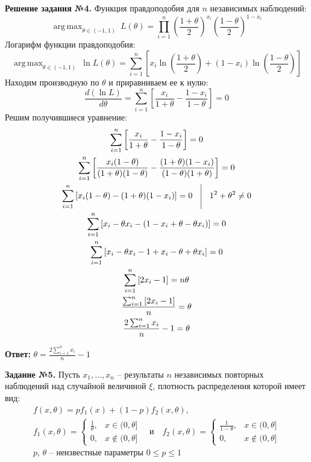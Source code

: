 \documentclass[a4paper, 12pt]{article}
\DeclareMathOperator*{\argmax}{arg\,max}
\begin{document}
{\vspace{0.5cm}

\textbf{Решение задания №4.} Функция правдоподобия для $n$ независимых наблюдений:
\[
    \argmax_{\theta \in (-1, 1)} \ L(\theta) = \prod_{i=1}^{n} \left(\frac{1 + \theta}{2}\right)^{x_i} \left(\frac{1 - \theta}{2}\right)^{1 - x_i}
\]
Логарифм функции правдоподобия:
\[
    \argmax_{\theta \in (-1, 1)} \ \ln L(\theta) = \sum_{i=1}^{n} \left[ x_i \ln\left(\frac{1 + \theta}{2}\right) + (1 - x_i) \ln\left(\frac{1 - \theta}{2}\right) \right]
\]
Находим производную по $\theta$ и приравниваем ее к нулю:
\[
    \frac{d(\ln L)}{d\theta} = \sum_{i=1}^{n} \left[ \frac{x_i}{1 + \theta} - \frac{1 - x_i}{1 - \theta} \right] = 0
\]
Решим получившиеся уравнение:
\begin{gather*}
    \sum_{i=1}^{n} \left[ \frac{x_i}{1 + \theta} - \frac{1 - x_i}{1 - \theta} \right] = 0 \\ 
    \sum_{i=1}^{n} \left[ \frac{x_i(1 - \theta)}{(1 + \theta)(1 - \theta)} - \frac{(1 + \theta)(1 - x_i)}{(1 - \theta)(1 + \theta)} \right] = 0 \\ 
    \sum_{i=1}^{n} \left[ x_i(1 - \theta) - (1 + \theta)(1 - x_i) \right] = 0 \quad \vrule \quad 1^2 + \theta^2 \ne 0 \\ 
    \sum_{i=1}^{n} \left[ x_i - \theta x_i - (1 - x_i + \theta - \theta x_i) \right] = 0 \\ 
    \sum_{i=1}^{n} \left[ x_i - \theta x_i - 1 + x_i - \theta + \theta x_i \right] = 0 \\ 
    \sum_{i=1}^{n} \left[ 2x_i - 1\right] = n\theta \\ 
    \frac{\sum_{i=1}^{n} \left[ 2x_i - 1\right]}{n} = \theta \\ 
    \frac{2\sum_{i=1}^{n} x_i}{n}  - 1 = \theta
\end{gather*}

\textbf{Ответ:} $\displaystyle \theta = \frac{2\sum_{i=1}^{n} x_i}{n}  - 1$

\newpage 

\textbf{Задание №5.} Пусть $x_1, \dots, x_n$ -- результаты $n$ независимых повторных наблюдений над случайной величиной $\xi$, плотность распределения которой имеет вид:
\begin{gather*}
    f(x, \theta) = pf_1(x) + (1 - p)f_2(x, \theta), \\ 
    f_1(x, \theta) = 
    \begin{cases}
        \frac{1}{\theta}, & x \in (0, \theta] \\ 
        0, & x \not \in (0, \theta]
    \end{cases} \quad \text{и} \quad 
    f_2(x, \theta) = 
    \begin{cases}
        \frac{1}{1 - \theta}, & x \in (0, \theta] \\ 
        0, & x \not \in (0, \theta]
    \end{cases} \\
    \text{$p$, $\theta$ -- неизвестные параметры $0 \le p \le 1$}
\end{gather*}
    
}
\end{document}
